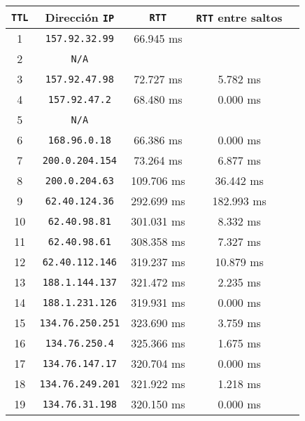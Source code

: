 \renewcommand{\arraystretch}{1.5}
\begin{tabular}{|c|c|c|c|c|} \hline
\texttt{TTL} & Dirección \texttt{IP} & \texttt{RTT} & \texttt{RTT} entre saltos \\ \hline
 1 & \texttt{157.92.32.99}   &  66.945 ms &            \\
 2 & \texttt{N/A}            &            &            \\
 3 & \texttt{157.92.47.98}   &  72.727 ms &   5.782 ms \\
 4 & \texttt{157.92.47.2}    &  68.480 ms &   0.000 ms \\
 5 & \texttt{N/A}            &            &            \\
 6 & \texttt{168.96.0.18}    &  66.386 ms &   0.000 ms \\
 7 & \texttt{200.0.204.154}  &  73.264 ms &   6.877 ms \\
 8 & \texttt{200.0.204.63}   & 109.706 ms &  36.442 ms \\
 9 & \texttt{62.40.124.36}   & 292.699 ms & 182.993 ms \\
10 & \texttt{62.40.98.81}    & 301.031 ms &   8.332 ms \\
11 & \texttt{62.40.98.61}    & 308.358 ms &   7.327 ms \\
12 & \texttt{62.40.112.146}  & 319.237 ms &  10.879 ms \\
13 & \texttt{188.1.144.137}  & 321.472 ms &   2.235 ms \\
14 & \texttt{188.1.231.126}  & 319.931 ms &   0.000 ms \\
15 & \texttt{134.76.250.251} & 323.690 ms &   3.759 ms \\
16 & \texttt{134.76.250.4}   & 325.366 ms &   1.675 ms \\
17 & \texttt{134.76.147.17}  & 320.704 ms &   0.000 ms \\
18 & \texttt{134.76.249.201} & 321.922 ms &   1.218 ms \\
19 & \texttt{134.76.31.198}  & 320.150 ms &   0.000 ms \\ \hline
\end{tabular}
